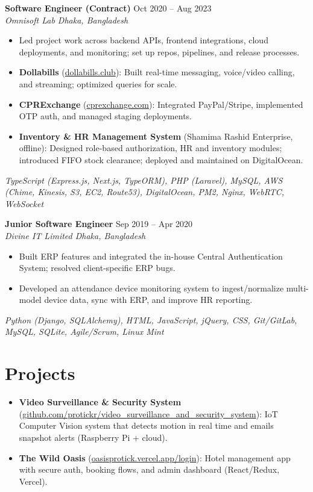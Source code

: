 \documentclass[a4paper,10pt]{article}
\begin{document}
\vspace{1pt}

\textbf{Software Engineer (Contract)} \hfill Oct 2020 -- Aug 2023\\[-2pt]
\textit{Omnisoft Lab \textbar{} Dhaka, Bangladesh}\\[-4pt]
\begin{itemize}
  \item Led project work across backend APIs, frontend integrations, cloud deployments, and monitoring; set up repos, pipelines, and release processes.
  \item \textbf{Dollabills} (\href{https://dollabills.club}{dollabills.club}): Built real-time messaging, voice/video calling, and streaming; optimized queries for scale.
  \item \textbf{CPRExchange} (\href{https://cprexchange.com}{cprexchange.com}): Integrated PayPal/Stripe, implemented OTP auth, and managed staging deployments.
\item \textbf{Inventory \& HR Management System} (Shamima Rashid Enterprise, offline): Designed role-based authorization, HR and inventory modules; introduced FIFO stock clearance; deployed and maintained on DigitalOcean.
\end{itemize}
\emph{TypeScript (Express.js, Next.js, TypeORM), PHP (Laravel), MySQL, AWS (Chime, Kinesis, S3, EC2, Route53), DigitalOcean, PM2, Nginx, WebRTC, WebSocket}

\vspace{1pt}

\textbf{Junior Software Engineer} \hfill Sep 2019 -- Apr 2020\\[-2pt]
\textit{Divine IT Limited \textbar{} Dhaka, Bangladesh}\\[-4pt]
\begin{itemize}
  \item Built ERP features and integrated the in-house Central Authentication System; resolved client-specific ERP bugs.
  \item Developed an attendance device monitoring system to ingest/normalize multi-model device data, sync with ERP, and improve HR reporting.
\end{itemize}
\emph{Python (Django, SQLAlchemy), HTML, JavaScript, jQuery, CSS, Git/GitLab, MySQL, SQLite, Agile/Scrum, Linux Mint}

\section*{Projects}
\begin{itemize}
  \item \textbf{Video Surveillance \& Security System} (\href{https://github.com/protickr/video_surveillance_and_security_system}{github.com/protickr/video\_surveillance\_and\_security\_system}): IoT Computer Vision system that detects motion in real time and emails snapshot alerts (Raspberry Pi + cloud).
  \item \textbf{The Wild Oasis} (\href{https://oasisprotick.vercel.app/login}{oasisprotick.vercel.app/login}): Hotel management app with secure auth, booking flows, and admin dashboard (React/Redux, Vercel).
\end{itemize}
\end{document}
